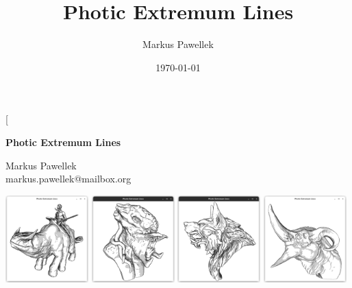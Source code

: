\documentclass[9pt,fleqn,twoside,twocolumn]{stdglobal}
\title{%
  Photic Extremum Lines
}
\author{Markus Pawellek}
\date{\today}
\begin{document}
\thispagestyle{sectionstyle}

\twocolumn[{\begin{@twocolumnfalse}%
  \begin{center}
    \Large
    \bfseries
    Photic Extremum Lines
  \end{center}%
  \vspace{1pt}
  \begin{center}
    Markus Pawellek \\
    markus.pawellek@mailbox.org
  \end{center}
  \vspace{1em}
  \begin{center}
    \includegraphics[width=0.24\textwidth,trim={15px 15 15 50},clip]{images/rider.png}
    \hfill
    \includegraphics[width=0.24\textwidth,trim={15px 15 15 50},clip]{images/predator-intro.png}
    \hfill
    \includegraphics[width=0.24\textwidth,trim={15px 15 15 50},clip]{images/werewolf-intro.png}
    \hfill
    \includegraphics[width=0.24\textwidth,trim={15px 15 15 50},clip]{images/dragon-head-contour-pel-toon-shader.png}

\end{center}
\end{@twocolumnfalse}}
\end{document}
